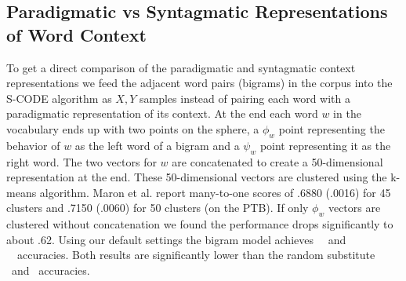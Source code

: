 
\subsection{Paradigmatic vs Syntagmatic Representations of Word Context}\label{sec:bigram}

To get a direct comparison of the paradigmatic and syntagmatic context
representations we feed the adjacent word pairs (bigrams) in the
corpus into the S-CODE algorithm as $X, Y$ samples
\cite{maron2010sphere} instead of pairing each word with a
paradigmatic representation of its context.  At the end each word $w$
in the vocabulary ends up with two points on the sphere, a $\phi_w$
point representing the behavior of $w$ as the left word of a bigram
and a $\psi_w$ point representing it as the right word.  The two
vectors for $w$ are concatenated to create a 50-dimensional
representation at the end.  These 50-dimensional vectors are clustered
using the k-means algorithm.  Maron et al. 
report many-to-one scores of .6880 (.0016) for 45 clusters and .7150
(.0060) for 50 clusters (on the PTB).  If only $\phi_w$ vectors are
clustered without concatenation we found the performance drops
significantly to about .62.  Using our default settings the bigram
model achieves \bgmto\ \mto\ and \bgvm\ \vm\ accuracies.  Both results are
significantly lower than the random substitute \mto\ and
\vm\ accuracies.
